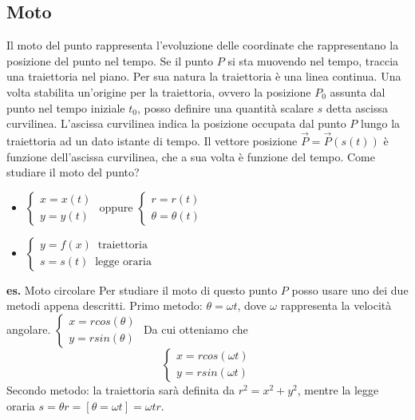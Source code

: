 \subsection{Moto}
Il moto del punto rappresenta l'evoluzione delle coordinate che rappresentano la posizione del punto nel tempo. Se il punto $P$ si sta muovendo nel tempo, traccia una traiettoria nel piano. Per sua natura la traiettoria è una linea continua.\newline
Una volta stabilita un'origine per la traiettoria, ovvero la posizione $P_0$ assunta dal punto nel tempo iniziale $t_0$, posso definire una quantità scalare $s$ detta ascissa curvilinea. L'ascissa curvilinea indica la posizione occupata dal punto $P$ lungo la traiettoria ad un dato istante di tempo. Il vettore posizione $\vec{P} = \vec{P}(s(t))$ è funzione dell'ascissa curvilinea, che a sua volta è funzione del tempo.\newline
Come studiare il moto del punto?
\begin{itemize}
    \item $\begin{cases}
        x = x(t)\\
        y = y(t)
    \end{cases}$ oppure $\begin{cases}
        r = r(t)\\
        \theta = \theta(t)
    \end{cases}$
    \item $\begin{cases}
        y=f(x) \;\; \text{traiettoria}\;\\
        s = s(t) \;\; \text{legge oraria}\;
    \end{cases}$
\end{itemize}
\textbf{es.} Moto circolare \newline
Per studiare il moto di questo punto $P$ posso usare uno dei due metodi appena descritti.\newline
Primo metodo:\newline
$\theta = \omega t$, dove $\omega$ rappresenta la velocità angolare.\newline
$\begin{cases}
    x = r cos(\theta)\\
    y = r sin(\theta)
\end{cases}$
Da cui otteniamo che
\[
    \begin{cases}
        x = r cos(\omega t)\\
        y = r sin(\omega t)
    \end{cases}
\]
Secondo metodo:\newline
la traiettoria sarà definita da $r^2 = x^2 + y^2$, mentre la legge oraria $s = \theta r = [\theta = \omega t] = \omega t r$.\newline

